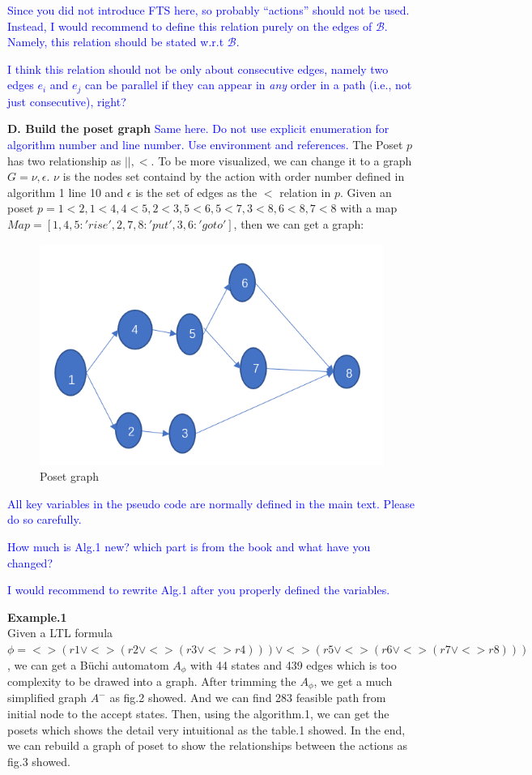\documentclass{article}
\newcommand{\blue}[1]{\textcolor{blue}{#1}}
\begin{document}
\blue{Since you did not introduce FTS here, so probably ``actions'' should not be used. Instead, I would recommend to define this relation purely on the edges of $\mathcal{B}$. Namely, this relation should be stated w.r.t $\mathcal{B}$.}

\blue{I think this relation should not be only about consecutive edges, namely two edges $e_i$ and $e_j$ can be parallel if they can appear in \emph{any} order in a path (i.e., not just consecutive), right?}
    

    \textbf{D. Build the poset graph}
    \blue{Same here. Do not use explicit enumeration for algorithm number and line number. Use environment and references.}
     The Poset $p$ has two relationship as $|| , <$. To be more visualized, we can change it to a graph $G={\nu,\epsilon}$. $\nu$ is the nodes set containd by the action with order number defined in algorithm 1 line 10 and $\epsilon$ is the set of edges as the $<$ relation in $p$. Given an poset $p={1<2,1<4,4<5,2<3,5<6,5<7,3<8,6<8,7<8}$ with a map $Map=[1,4,5:'rise',2,7,8:'put',3,6:'goto']$, then we can get a graph:
     \begin{figure}[htp]
     	\centering
     	\includegraphics[width=0.66\linewidth,height=0.4\linewidth]{fig/1.jpg}
     	\caption{Poset graph}
     \end{figure}

\blue{All key variables in the pseudo code are normally defined in the main text. Please do so carefully.}

\blue{How much is Alg.1 new? which part is from the book and what have you changed?}

\blue{I would recommend to rewrite Alg.1 after you properly defined the variables.}

 
 \textbf{Example.1}\\
 	Given a LTL formula $\phi=<>( r1 \vee <>(r2 \vee <>(r3 \vee <> r4))) \vee <>( r5 \vee <>(r6 \vee <>(r7 \vee <> r8)))$, we can get a B\"{u}chi automatom $A_\phi$ with 44 states and 439 edges which is too complexity to be drawed into a graph. After trimming the $A_\phi$, we get a much simplified graph $A^-$ as fig.2 showed. And we can find 283 feasible path from initial node to the accept states. Then, using the algorithm.1, we can get the posets which shows the detail very intuitional as the table.1 showed. In the end, we can rebuild a graph of poset to show the relationships between the actions as fig.3 showed.
\end{document}
